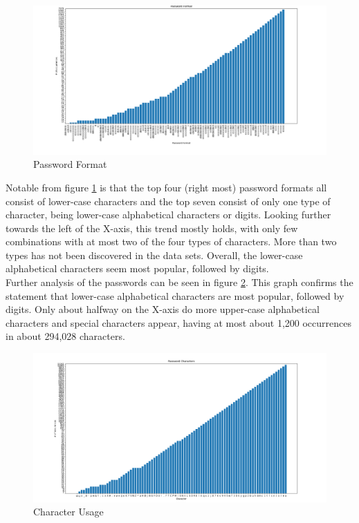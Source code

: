 \documentclass[a4paper,12pt]{article}
\begin{document}
\begin{figure}[!ht]
  \centering
  \hspace*{-5.4cm}
  \includegraphics[width=1.8\textwidth]{password_formats}
  \caption{Password Format}
  \label{fig:pform}
\end{figure}

Notable from figure \ref{fig:pform} is that the top four (right most) password formats all consist of lower-case characters and the top seven consist of only one type of character, being lower-case alphabetical characters or digits. Looking further towards the left of the X-axis, this trend mostly holds, with only few combinations with at most two of the four types of characters. More than two types has not been discovered in the data sets. Overall, the lower-case alphabetical characters seem most popular, followed by digits.\\

Further analysis of the passwords can be seen in figure \ref{fig:pchar}. This graph confirms the statement that lower-case alphabetical characters are most popular, followed by digits. Only about halfway on the X-axis do more upper-case alphabetical characters and special characters appear, having at most about 1,200 occurrences in about 294,028 characters.

\begin{figure}[!ht]
  \centering
  \hspace*{-5.4cm}
  \includegraphics[width=1.8\textwidth]{password_chars}
  \caption{Character Usage}
  \label{fig:pchar}
\end{figure}
\end{document}
